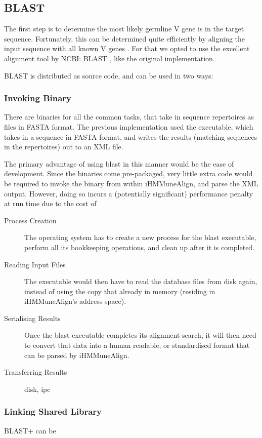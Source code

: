 \subsection{BLAST}
The first step is to determine the most likely germline V gene is in the target sequence. Fortunately, this can be determined quite efficiently by aligning the input sequence with all known V genes \cite{iHMMuneAlign}. For that we opted to use the excellent alignment tool by NCBI: BLAST \cite{blast}, like the original implementation.

BLAST is distributed as source code, and can be used in two ways:
\subsubsection{Invoking Binary}
There are binaries for all the common tasks, that take in sequence repertoires as files in FASTA \autocite{fasta} format. The previous implementation used the  executable, which takes in a sequence in FASTA format, and writes the results (matching sequences in the repertoires) out to an XML file.

The primary advantage of using blast in this manner would be the ease of development. Since the binaries come pre-packaged, very little extra code would be required to invoke the binary from within iHMMuneAlign, and parse the XML output. However, doing so incurs a (potentially significant) performance penalty at run time due to the cost of

\begin{description}
	\item[Process Creation]
	The operating system has to create a new process for the blast executable, perform all its bookkeeping operations, and clean up after it is completed.
	\item[Reading Input Files]
	The executable would then have to read the database files from disk again, instead of using the copy that already in memory (residing in iHMMuneAlign's address space).
	\item[Serialising Results]
	Once the blast executable completes its alignment search, it will then need to convert that data into a human readable, or standardised format that can be parsed by iHMMuneAlign.
	\item[Transferring Results]
	disk, ipc
\end{description}

\subsubsection{Linking Shared Library}
BLAST+ can be 


